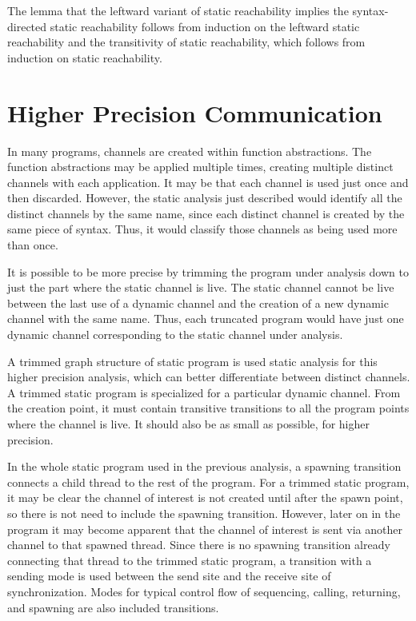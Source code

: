 \documentclass{article}
\begin{document}
The lemma that the leftward variant of static reachability implies the syntax-directed static
reachability follows from induction on the leftward static reachability and the
transitivity of static
reachability, which follows from induction on static reachability.

\section{Higher Precision Communication}
In many programs, channels are created within function abstractions.  The function abstractions
may be applied multiple times, creating multiple distinct channels with each application.
It may be that each channel is used just once and then discarded.  However, the static
analysis just described would identify all the distinct channels by the same name, since each
distinct channel is created by the same piece of syntax. Thus, it would classify those channels
as being used more than once.

It is possible to be more precise by trimming the program under analysis down to just the part
where the static channel is live. The static channel cannot be live between the last use of a
dynamic channel and the creation of a new dynamic channel with the same name.  Thus, each
truncated program would have just one dynamic channel corresponding to the static channel under
analysis. 

A trimmed graph structure of static program is used static analysis for this higher precision
analysis, which can better differentiate between distinct channels. 
A trimmed static program is specialized for a particular dynamic channel.  From the creation
point, it must contain transitive transitions to all the program points where the
channel is live. It should also be as small as possible, for higher precision.

In the whole static program used in the previous analysis, a spawning transition
connects a child thread to the rest of the program.  For a trimmed static program,
it may be clear the channel of interest is not created until after the spawn point,
so there is not need to include the spawning transition.  However, later on in the
program it may become apparent that the channel of interest is sent via another channel to
that spawned thread.  Since there is no spawning transition already connecting that
thread to the trimmed static program, a transition with a sending mode is used between the
send site and the receive site of synchronization. Modes for typical control flow of
sequencing, calling, returning, and spawning are also included transitions.
\end{document}
